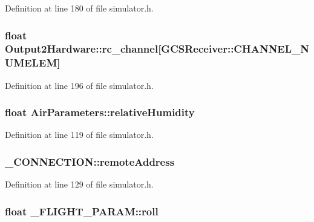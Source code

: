 \-Definition at line 180 of file simulator.\-h.

\hypertarget{group___h_i_t_l_plugin_gadf58977eef899196280267ae39cc6f65}{
\subsubsection[{rc\-\_\-channel}]{\setlength{\rightskip}{0pt plus 5cm}float {\bf \-Output2\-Hardware\-::rc\-\_\-channel}\mbox{[}\-G\-C\-S\-Receiver\-::\-C\-H\-A\-N\-N\-E\-L\-\_\-\-N\-U\-M\-E\-L\-E\-M\mbox{]}}}\label{group___h_i_t_l_plugin_gadf58977eef899196280267ae39cc6f65}


\-Definition at line 196 of file simulator.\-h.

\hypertarget{group___h_i_t_l_plugin_ga259002c03d3dec62e3af14ded35e5bfd}{
\subsubsection[{relative\-Humidity}]{\setlength{\rightskip}{0pt plus 5cm}float {\bf \-Air\-Parameters\-::relative\-Humidity}}}\label{group___h_i_t_l_plugin_ga259002c03d3dec62e3af14ded35e5bfd}


\-Definition at line 119 of file simulator.\-h.

\hypertarget{group___h_i_t_l_plugin_ga72b83e685c950b6c36c9eed28c775ec4}{
\subsubsection[{remote\-Address}]{ {\bf \-\_\-\-C\-O\-N\-N\-E\-C\-T\-I\-O\-N\-::remote\-Address}}}\label{group___h_i_t_l_plugin_ga72b83e685c950b6c36c9eed28c775ec4}


\-Definition at line 129 of file simulator.\-h.

\hypertarget{group___h_i_t_l_plugin_ga1e4f51848f0c33a0264bc1fc9acb63db}{
\subsubsection[{roll}]{\setlength{\rightskip}{0pt plus 5cm}float {\bf \-\_\-\-F\-L\-I\-G\-H\-T\-\_\-\-P\-A\-R\-A\-M\-::roll}}}\label{group___h_i_t_l_plugin_ga1e4f51848f0c33a0264bc1fc9acb63db}



